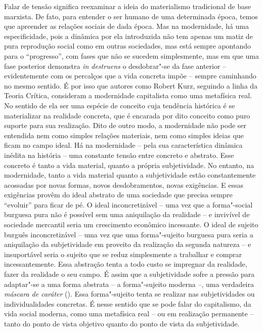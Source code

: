 Falar de tensão significa reexaminar a ideia do materialismo tradicional
de base marxista. De fato, para entender o ser humano de uma determinada
época, temos que apreender as relações sociais de dada época. Mas na
modernidade, há uma especificidade, pois a dinâmica por ela introduzida
não tem apenas um matiz de pura reprodução social como em outras
sociedades, mas está sempre apontando para o ``progresso'', com fases
que não se sucedem simplesmente, mas em que uma fase posterior demonstra
\emph{in destruens} o desdobrar"-se da fase anterior -- evidentemente com
os percalços que a vida concreta impõe -- sempre caminhando no mesmo
sentido. É por isso que autores como Robert Kurz, seguindo a linha da
Teoria Crítica, consideram a modernidade capitalista como uma metafísica
real. No sentido de ela ser uma espécie de conceito cuja tendência
histórica é se materializar na realidade concreta, que é encarada por
dito conceito como puro suporte para sua realização. Dito de outro modo,
a modernidade não pode ser entendida nem como simples relações
materiais, nem como simples ideias que ficam no campo ideal. Há na
modernidade -- pela sua característica dinâmica inédita na história --
uma constante tensão entre concreto e abstrato. Esse concreto é tanto a
vida material, quanto a própria subjetividade. No entanto, na
modernidade, tanto a vida material quanto a subjetividade estão
constantemente acossadas por novas formas, novos desdobramentos, novas
exigências. E essas exigências provêm do ideal abstrato de uma sociedade
que precisa sempre ``evoluir'' para ficar de pé. O ideal inconcretizável
-- uma vez que a forma"-social burguesa pura não é possível sem uma
aniquilação da realidade -- e invivível de sociedade mercantil seria um
crescimento econômico incessante. O ideal de sujeito burguês
inconcretizável -- uma vez que uma forma"-sujeito burguesa pura seria a
aniquilação da subjetividade em proveito da realização da segunda
natureza -- e insuportável seria o sujeito que se reduz simplesmente a
trabalhar e comprar incessantemente. Essa abstração tenta a todo custo
se impregnar da realidade, fazer da realidade o seu campo. É assim que a
subjetividade sofre a pressão para adaptar"-se a uma forma abstrata -- a
forma"-sujeito moderna --, uma verdadeira \emph{máscara de caráter}
(). Essa forma"-sujeito tenta se realizar nas subjetividades ou
individualidades concretas. É nesse sentido que se pode falar do
capitalismo, da vida social moderna, como uma metafísica real -- ou em
realização permanente -- tanto do ponto de vista objetivo quanto do
ponto de vista da subjetividade.

